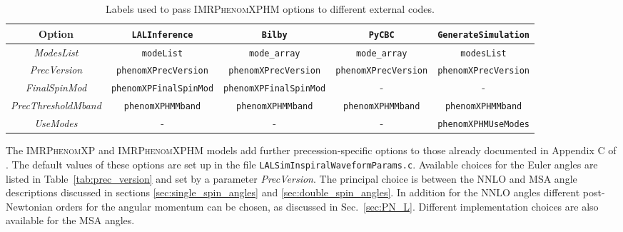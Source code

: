 \documentclass[%
aps,
prd,
amssymb,
amsmath,
amsfonts,
eqsecnum,
showpacs,
nofootinbib,
floatfix,
twocolumn,
twoside,
a4paper,
superscriptaddress
]{revtex4-1}
\newcommand{\phXP}{\textsc{IMRPhenomXP}\xspace}
\newcommand{\phXPHM}{\textsc{IMRPhenomXPHM}\xspace}
\begin{document}
\begin{table}[hptb]
    \centering
    \begin{tabular}{|c||c|c|c|c|}
    \hline
        Option & \texttt{LALInference} & \texttt{Bilby} & \texttt{PyCBC} & \texttt{GenerateSimulation} \\ \hline\hline
        \textit{ModesList} & \texttt{modeList} & \texttt{mode\_array} & \texttt{mode\_array} & \texttt{modesList} \\ \hline
        \textit{PrecVersion} &  \texttt{phenomXPrecVersion} & \texttt{phenomXPrecVersion} & \texttt{phenomXPrecVersion} & \texttt{phenomXPrecVersion} \\ \hline
        \textit{FinalSpinMod} & \texttt{phenomXPFinalSpinMod} & \texttt{phenomXPFinalSpinMod} & - & -\\ \hline
        \textit{PrecThresholdMband} & \texttt{phenomXPHMMband} & \texttt{phenomXPHMMband} & \texttt{phenomXPHMMband} & \texttt{phenomXPHMMband} \\ \hline
        \textit{UseModes} & - & - & - & \texttt{phenomXPHMUseModes}\\ \hline
    \end{tabular}
    \caption{Labels used to pass \phXPHM options to different external codes. }
    \label{tab:external_options}
\end{table}

The \phXP and \phXPHM models add further precession-specific options to those already documented in 
Appendix C of \cite{Garcia-Quiros:2020qpx}.  The default values of these options are set up in the file {\tt LALSimInspiralWaveformParams.c}. 
%
Available choices for the Euler angles are listed in Table~\ref{tab:prec_version} and set by a parameter 
\textit{PrecVersion}. The principal choice is between the NNLO and MSA angle descriptions discussed in sections \ref{sec:single_spin_angles} and \ref{sec:double_spin_angles}.
In addition for the NNLO angles different post-Newtonian orders for the angular momentum can be chosen, as discussed in Sec.~\ref{sec:PN_L}.
Different implementation choices are also available for the MSA angles.
\end{document}
